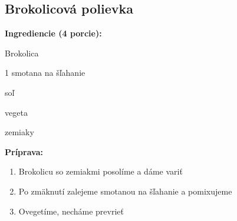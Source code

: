 \setcounter{step}{0}

\subsection{ Brokolicová polievka }

\begin{ingredient}
  
  \def\portions{  }
  \textbf{ {\normalsize Ingrediencie (4 porcie):} }

  \begin{main}
      \item Brokolica
      \item 1 smotana na šľahanie
      \item soľ
      \item vegeta
      \item zemiaky
  \end{main}
  
\end{ingredient}
\begin{recipe}
\textbf{ {\normalsize Príprava:} }
\begin{enumerate}

  \item{Brokolicu so zemiakmi posolíme a dáme variť}
  \item{Po zmäknutí zalejeme smotanou na šľahanie a pomixujeme}
  \item{Ovegetíme, necháme prevrieť}

\end{enumerate}
\end{recipe}

\begin{notes}
  
\end{notes}	
\clearpage
